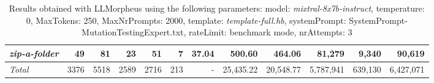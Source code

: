 \begin{table*}
{\begin{tabular}{l||r|r|r|r|r|r||r|r||r|r|r}
   \hline
   \textit{zip-a-folder} & 49 & 81 & 23 & 51 & 7 & 37.04 & 500.60 & 464.06 & 81,279 & 9,340 & 90,619 \\ 
   \hline
   \textit{Total} & 3376 & 5518 & 2589 & 2716 & 213 & - & 25,435.22  & 20,548.77 & 5,787,941 & 639,130 & 6,427,071 \\ 
 \end{tabular}
 }
 \caption{Results obtained with LLMorpheus using the following parameters: 
   model: \textit{mixtral-8x7b-instruct}, 
   temperature: 0, 
   MaxTokens: 250, 
   MaxNrPrompts: 2000, 
   template: \textit{template-full.hb}, 
   systemPrompt: SystemPrompt-MutationTestingExpert.txt, 
   rateLimit: benchmark mode, 
   nrAttempts: 3  
 }
\end{table*}

